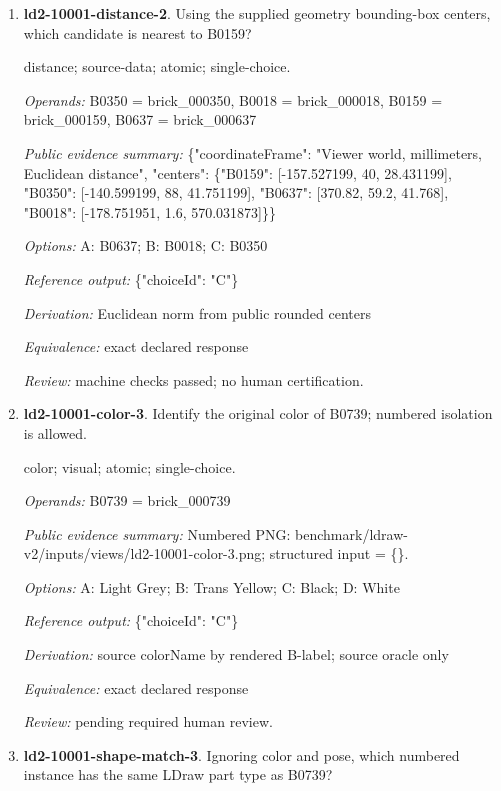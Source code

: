 \begin{enumerate}
\item \textbf{ld2-10001-distance-2}. Using the supplied geometry bounding-box centers, which candidate is nearest to B0159?
\par{\small distance; source-data; atomic; single-choice.\par\textit{Operands:} B0350 = brick\_000350, B0018 = brick\_000018, B0159 = brick\_000159, B0637 = brick\_000637\par\textit{Public evidence summary:} \{"coordinateFrame": "Viewer world, millimeters, Euclidean distance", "centers": \{"B0159": [-157.527199, 40, 28.431199], "B0350": [-140.599199, 88, 41.751199], "B0637": [370.82, 59.2, 41.768], "B0018": [-178.751951, 1.6, 570.031873]\}\}\par\textit{Options:} A: B0637; B: B0018; C: B0350\par\textit{Reference output:} \{"choiceId": "C"\}\par\textit{Derivation:} Euclidean norm from public rounded centers\par\textit{Equivalence:} exact declared response\par\textit{Review:} machine checks passed; no human certification.}
\item \textbf{ld2-10001-color-3}. Identify the original color of B0739; numbered isolation is allowed.
\par{\small color; visual; atomic; single-choice.\par\textit{Operands:} B0739 = brick\_000739\par\textit{Public evidence summary:} Numbered PNG: benchmark/ldraw-v2/inputs/views/ld2-10001-color-3.png; structured input = \{\}.\par\textit{Options:} A: Light Grey; B: Trans Yellow; C: Black; D: White\par\textit{Reference output:} \{"choiceId": "C"\}\par\textit{Derivation:} source colorName by rendered B-label; source oracle only\par\textit{Equivalence:} exact declared response\par\textit{Review:} pending required human review.}
\item \textbf{ld2-10001-shape-match-3}. Ignoring color and pose, which numbered instance has the same LDraw part type as B0739?

\end{enumerate}
